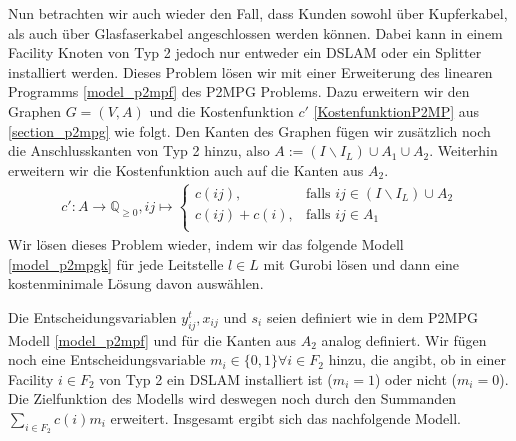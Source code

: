 \documentclass[11pt,a4paper]{article}
\newcommand{\Q}{\mathbb{Q}}
\theoremstyle{my_th_style1}
\begin{document}
Nun betrachten wir auch wieder den Fall, dass Kunden sowohl \"uber Kupferkabel, als auch \"uber Glasfaserkabel angeschlossen werden k\"onnen.
Dabei kann in einem Facility Knoten von Typ 2 jedoch nur entweder ein DSLAM oder ein Splitter installiert werden.
Dieses Problem lösen wir mit einer Erweiterung des linearen Programms \ref{model_p2mpf} des P2MPG Problems.
Dazu erweitern wir den Graphen \(G = (V,A)\) und die Kostenfunktion \(c'\) \eqref{KostenfunktionP2MP} aus \ref{section_p2mpg} wie folgt.
Den Kanten des Graphen f\"ugen wir zus\"atzlich noch die Anschlusskanten von Typ 2 hinzu, also \(A := (I \backslash I_L ) \cup A_1 \cup A_2\).
Weiterhin erweitern wir die Kostenfunktion auch auf die Kanten aus \(A_2\).
\begin{align}
\label{KostenfunktionP2MPGK}
c': A \rightarrow \Q_{ \geq 0}, ij  \mapsto \left\{\begin{array}{cl} 
c(ij), & \text{falls } ij \in (I\backslash I_L) \cup A_2\\ 
c(ij)+c(i), & \text{falls } ij \in A_1\\ 
\end{array}
\right.
\end{align}
Wir l\"osen dieses Problem wieder, indem wir das folgende Modell \ref{model_p2mpgk} für jede Leitstelle $l \in L $ mit Gurobi \cite{gurobi} lösen und dann eine kostenminimale L\"osung davon ausw\"ahlen.

Die Entscheidungsvariablen $y_{ij}^t,x_{ij}$ und $s_i$ seien definiert wie in dem P2MPG Modell \ref{model_p2mpf} und f\"ur die Kanten aus \(A_2\) analog definiert.
Wir fügen noch eine Entscheidungsvariable $m_i \in \{0,1\} \forall i \in F_2$ hinzu, die angibt, ob in einer Facility \(i \in F_2\) von Typ 2 ein DSLAM installiert ist (\(m_i = 1\)) oder nicht (\(m_i = 0\)).
Die Zielfunktion des Modells wird deswegen noch durch den Summanden $\displaystyle\sum_{i \in F_2} c(i) m_i$ erweitert.
Insgesamt ergibt sich das nachfolgende Modell.
\end{document}
